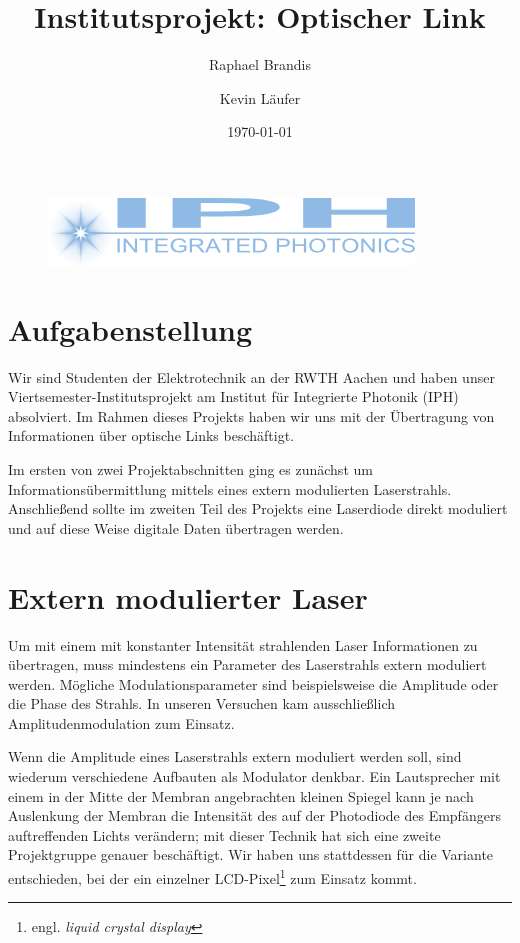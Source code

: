 \documentclass[12pt,a4paper]{article}
\title{Institutsprojekt: Optischer Link}
\author{Raphael Brandis \and Kevin Läufer}
\date{\today}
\begin{document}
\maketitle
\vfill

\begin{figure}[h]
  \centering
    \includegraphics{../iph_logo.png}
\end{figure}

\newpage
\tableofcontents
\newpage

\section{Aufgabenstellung}
Wir sind Studenten der Elektrotechnik an der RWTH Aachen und haben unser Viertsemester-Institutsprojekt am Institut für Integrierte Photonik (IPH) absolviert. Im Rahmen dieses Projekts haben wir uns mit der Übertragung von Informationen über optische Links beschäftigt.

Im ersten von zwei Projektabschnitten ging es zunächst um Informationsübermittlung mittels eines extern modulierten Laserstrahls. Anschließend sollte im zweiten Teil des Projekts eine Laserdiode direkt moduliert und auf diese Weise digitale Daten übertragen werden.


\section{Extern modulierter Laser}
Um mit einem mit konstanter Intensität strahlenden Laser Informationen zu übertragen, muss mindestens ein Parameter des Laserstrahls extern moduliert werden. Mögliche Modulationsparameter sind beispielsweise die Amplitude oder die Phase des Strahls. In unseren Versuchen kam ausschließlich Amplitudenmodulation zum Einsatz.

Wenn die Amplitude eines Laserstrahls extern moduliert werden soll, sind wiederum verschiedene Aufbauten als Modulator denkbar. Ein Lautsprecher mit einem in der Mitte der Membran angebrachten kleinen Spiegel kann je nach Auslenkung der Membran die Intensität des auf der Photodiode des Empfängers auftreffenden Lichts verändern; mit dieser Technik hat sich eine zweite Projektgruppe genauer beschäftigt. Wir haben uns stattdessen für die Variante entschieden, bei der ein einzelner LCD-Pixel\footnote{engl. \textit{liquid crystal display}} zum Einsatz kommt.
\end{document}
